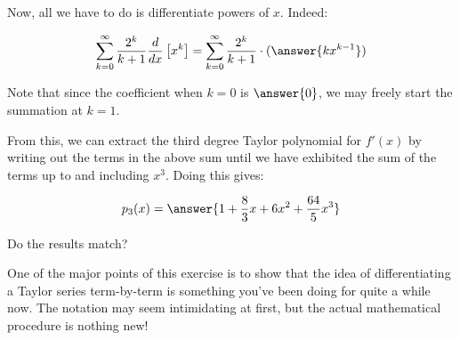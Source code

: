 \documentclass{ximera}
\begin{document}
\begin{exercise}
\begin{exercise}
Now, all we have to do is differentiate powers of $x$.  Indeed:

\[
\sum_{k=0}^{\infty}\frac{2^k}{k+1} \frac{d}{dx} \left[ x^k  \right] = \sum_{k=0}^{\infty} \frac{2^k}{k+1} \cdot(\answer{kx^{k-1}})
\]

Note that since the coefficient when $k=0$ is $\answer{0}$, we may freely start the summation at $k=1$.  

From this, we can extract the third degree Taylor polynomial for $f'(x)$ by writing out the terms in the above sum until we have exhibited the sum of the terms up to and including $x^3$.  Doing this gives:

\[
p_3(x) = \answer{1+\frac{8}{3}x+6x^2+\frac{64}{5}x^3}
\] 

\end{exercise}
Do the results match?

\begin{multipleChoice}
\end{multipleChoice}

One of the major points of this exercise is to show that the idea of differentiating a Taylor series term-by-term is something you've been doing for quite a while now.  The notation may seem intimidating at first, but the actual mathematical procedure is nothing new!

\end{exercise}
\end{document}
